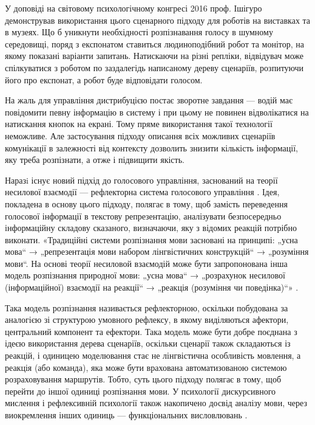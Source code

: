 У доповіді на світовому психологічному конгресі 2016 проф. Ішігуро демонстрував використання цього сценарного підходу для роботів на виставках та в музеях. Що б уникнути необхідності розпізнавання голосу в шумному середовищі, поряд з експонатом ставиться людиноподібний робот та монітор, на якому показані варіанти запитань. Натискаючи на різні репліки, відвідувач може спілкуватися з роботом по заздалегідь написаному дереву сценаріїв, розпитуючи його про експонат, а робот буде відповідати голосом.

На жаль для управління дистрибуцією постає зворотне завдання — водій має повідомити певну інформацію в систему і при цьому не повинен відволікатися на натискання кнопок на екрані. Тому пряме використання такої технології неможливе. Але застосування підходу описання всіх можливих сценаріїв комунікації в залежності від контексту дозволить знизити кількість інформації, яку треба розпізнати, а отже і підвищити якість.

Наразi існує новий підхід до голосового управління, заснований на теорії несилової взаємодії \cite{Teslia_2010} — рефлекторна система голосового управління \cite{Egorchenkov_2016}. Ідея, покладена в основу цього підходу, полягає в тому, щоб замість переведення голосової інформації в текстову репрезентацію, аналізувати безпосередньо інформаційну складову сказаного, визначаючи, яку з відомих реакцій потрібно виконати. «Традиційні системи розпізнання мови засновані на принципі: „усна мова“ → „репрезентація мови набором лінгвістичних конструкцій“ → „розуміння мови“. На основі теорії несиловой взаємодій може бути запропонована інша модель розпізнання природної мови: „усна мова“ → „розрахунок несилової (інформаційної) взаємодії на реакції“ → „реакція (розуміння чи поведінка)“» \cite{Teslia_2014}.

Така модель розпізнання називається рефлекторною, оскільки побудована за аналогією зі структурою умовного рефлексу, в якому виділяються афектори, центральний компонент та ефектори. Така модель може бути добре поєднана з ідеєю використання дерева сценаріїв, оскільки сценарії також складаються із реакцій, і одиницею моделювання стає не лінгвістична особливість мовлення, а реакція (або команда), яка може бути врахована автоматизованою системою розраховування маршрутів. Тобто, суть цього підходу полягає в тому, щоб перейти до іншої одиниці розпізнання мови. У психології дискурсивного мислення і рефлексивній психології також накопичено досвід аналізу мови, через виокремлення інших одиниць — функціональних висловлювань \cite{Naydonov_2008}.

